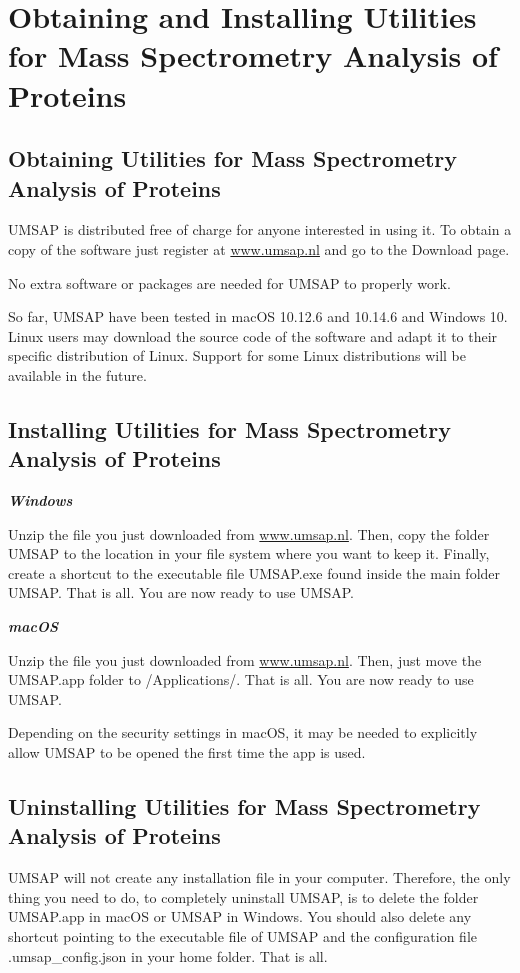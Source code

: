 \chapter{Obtaining and Installing Utilities for Mass Spectrometry Analysis of Proteins}

\section{Obtaining Utilities for Mass Spectrometry Analysis of Proteins}

UMSAP is distributed free of charge for anyone interested in using it. To obtain
a copy of the software just register at \href{https://www.umsap.nl}{www.umsap.nl}
and go to the Download page.

No extra software or packages are needed for UMSAP to properly work.

So far, UMSAP have been tested in macOS \num[parse-numbers=false]{10.12.6} and
\num[parse-numbers=false]{10.14.6} and Windows \num{10}.
Linux users may download the source code of the software and adapt it to their
specific distribution of Linux. Support for some Linux distributions will be
available in the future.

\section{Installing Utilities for Mass Spectrometry Analysis of Proteins}

\textit{\textbf{Windows}}

Unzip the file you just downloaded from \href{https://www.umsap.nl}{www.umsap.nl}.
Then, copy the folder UMSAP to the location in your file system where you want
to keep it. Finally, create a shortcut to the executable file UMSAP.exe found
inside the main folder UMSAP. That is all. You are now ready to use UMSAP.

\textit{\textbf{macOS}}

Unzip the file you just downloaded from \href{https://www.umsap.nl}{www.umsap.nl}.
Then, just move the UMSAP.app folder to /Applications/. That is all. You are now
ready to use UMSAP. 

Depending on the security settings in macOS, it may be needed to explicitly allow
UMSAP to be opened the first time the app is used.

\section{Uninstalling Utilities for Mass Spectrometry Analysis of Proteins}

UMSAP will not create any installation file in your computer. Therefore, the only
thing you need to do, to completely uninstall UMSAP, is to delete the folder
UMSAP.app in macOS or UMSAP in Windows. You should also delete any shortcut
pointing to the executable file of UMSAP and the configuration file
.umsap\_config.json in your home folder. That is all.